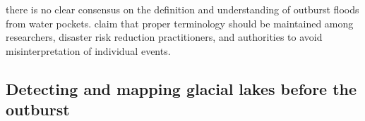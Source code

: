 there is no clear consensus on the definition and understanding of outburst floods from water pockets. \cite{Emmer&al2022} claim that proper terminology should be maintained among researchers, disaster risk reduction practitioners, and authorities to avoid misinterpretation of individual events. 






\subsection{Detecting and mapping glacial lakes before the outburst}%


